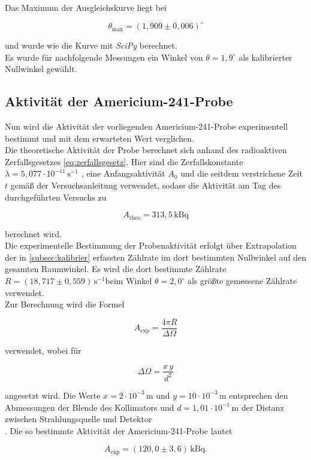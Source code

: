 Das Maximum der Ausgleichskurve liegt bei

\[
\theta_{\max} = (1{,}909 \pm 0{,}006)^\circ
\]

und wurde wie die Kurve mit \textit{SciPy} berechnet.\\
Es wurde für nachfolgende Messungen ein Winkel von $\theta = 1{,}9^\circ$ als kalibrierter Nullwinkel gewählt.

\subsection{Aktivität der Americium-241-Probe}
\label{subsec:aktivitaet}

Nun wird die Aktivität der vorliegenden Americium-241-Probe experimentell bestimmt und mit dem erwarteten Wert verglichen.\\
Die theoretische Aktivität der Probe berechnet sich anhand des radioaktiven Zerfallsgesetzes \eqref{eq:zerfallsgesetz}.
Hier sind die Zerfallskonstante $\lambda = 5{,}077 \cdot 10^{-11}\,\mathrm{s}^{-1}$ \cite{zerfallskonstante}, eine Anfangsaktivität $A_0$ und die seitdem verstrichene Zeit $t$  gemäß der Versuchsanleitung \cite{tudoV16} verwendet, sodass die Aktivität am Tag des durchgeführten Versuchs zu

\[
A_{\mathrm{theo}} = 313{,}5\,\si{\kilo\becquerel}
\]

berechnet wird.\\
Die experimentelle Bestimmung der Probenaktivität erfolgt über Extrapolation der in \autoref{subsec:kalibrier} erfassten Zählrate im dort bestimmten Nullwinkel
auf den gesamten Raumwinkel.
Es wird die dort bestimmte Zählrate $R = (18{,}717 \pm 0{,}559)\,\mathrm{s}^{-1}$beim Winkel $\theta = 2{,}0^\circ$ als größte gemessene Zählrate verwendet.\\
Zur Berechnung wird die Formel 

\[
A_{\mathrm{exp}} = \frac{4\pi R}{\Delta\Omega}
\]

verwendet, wobei für 

\[
\Delta\Omega = \frac{x\,y}{d^2}
\]

angesetzt wird. Die Werte $x = 2 \cdot 10^{-3}\,\mathrm{m}$ und $y = 10 \cdot 10^{-3}\,\mathrm{m}$ entsprechen den Abmessungen der Blende des Kollimators und $d = 1{,}01 \cdot 10^{-1}\,\mathrm{m}$ der Distanz zwischen Strahlungsquelle und Detektor \cite{tudoV16}\\.
Die so bestimmte Aktivität der Americium-241-Probe lautet

\[
A_{\mathrm{exp}} = (120{,}0 \pm 3{,}6)\,\mathrm{kBq}.
\]











